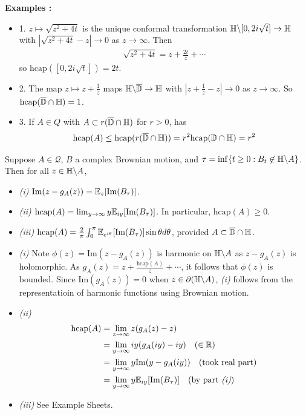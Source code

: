 \documentclass[12pt,a4paper]{article}
\newenvironment{proof}
{\begin{changemargin}{0.5cm}{0.5cm} 
	}%
	{\end{changemargin}
}
\renewenvironment{i}
{\begin{itemize} 
	}%
	{\end{itemize}
}
\newenvironment{p}
{\begin{proof} 
	}%
	{\end{proof}
}
\begin{document}
\textbf{Examples :}
\begin{i}
\item[1.] $z\mapsto \sqrt{z^2 + 4t}$ is the unique conformal transformation $\mathbb{H} \backslash [0, 2i\sqrt{t}] \rightarrow \mathbb{H}$ with $|\sqrt{z^2 + 4t} - z| \rightarrow 0$ as $z\rightarrow \infty$. Then
\begin{align*}
\sqrt{z^2 + 4t} = z+ \frac{2t}{z} + \cdots
\end{align*}
so $\text{hcap}([0, 2i\sqrt{t}]) =2t$.
\item[2.] The map $z\mapsto z+ \frac{1}{z}$ maps $\mathbb{H} \backslash \overline{\mathbb{D}} \rightarrow \mathbb{H}$ with $|z+ \frac{1}{z}-z| \rightarrow 0$ as $z\rightarrow \infty$. So $\text{hcap}(\overline{\mathbb{D}} \cap \mathbb{H}) =1$.
\item[3.] If $A\in Q$ with $A\subset r(\overline{\mathbb{D}}\cap \mathbb{H})$ for $r>0$, has
\begin{align*}
\text{hcap}(A) \leq \text{hcap}(r(\overline{\mathbb{D}}\cap \mathbb{H})) = r^2 \text{hcap}(\mathbb{D} \cap \mathbb{H}) = r^2
\end{align*}
\end{i}
\s

 Suppose $A\in \mathscr{Q}$, $B$ a complex Brownian motion, and $\tau = \inf \{t\geq 0 : B_t \not\in \mathbb{H} \backslash A\}$. Then for all $z\in \mathbb{H} \backslash A$,
\begin{i}
\item[\textit{(i)}] $\text{Im} (z- g_A(z)) = \mathbb{E}_z [\text{Im}(B_{\tau})]$.
\item[\textit{(ii)}] $\text{hcap}(A) = \lim_{y\rightarrow \infty} y \mathbb{E}_{iy} [\text{Im}(B_{\tau})]$. In particular, $\text{hcap}(A) \geq 0$.
\item[\textit{(iii)}] $\text{hcap}(A) = \frac{2}{\pi} \int_{0}^{\pi} \mathbb{E}_{e^{i\theta}} [\text{Im}(B_{\tau})] \sin \theta d\theta$, provided $A\subset \overline{\mathbb{D}}\cap \mathbb{H}$.
\end{i}
\begin{p}
\pf
\begin{i}
\item[\textit{(i)}] Note $\phi(z) = \text{Im}(z-g_A(z))$ is harmonic on $\mathbb{H} \backslash A$ as $z- g_A(z)$ is holomorphic. As $g_A(z) = z+ \frac{\text{hcap}(A)}{z} +\cdots$, it follows that $\phi(z)$ is bounded. Since $\text{Im}(g_A(z))=0$ when $z\in \partial (\mathbb{H} \backslash A)$, \textit{(i)} follows from the representatioin of harmonic functions using Brownian motion.
\item[\textit{(ii)}] 
\begin{align*}
\text{hcap}(A) &= \lim_{z\rightarrow \infty} z(g_A(z)-z) \\
&=\lim_{y\rightarrow \infty} iy (g_A(iy)-iy) \quad (\in \mathbb{R})\\
&= \lim_{y\rightarrow \infty} y \text{Im}(y - g_A(iy)) \quad (\text{took real part})\\
&=\lim_{y\rightarrow \infty} y\mathbb{E}_{iy}  [\text{Im}(B_{\tau})] \quad (\text{by part } \textit{(i)})
\end{align*}
\item[\textit{(iii)}] See Example Sheets.
\end{i}
\end{p}
\s
\end{document}
